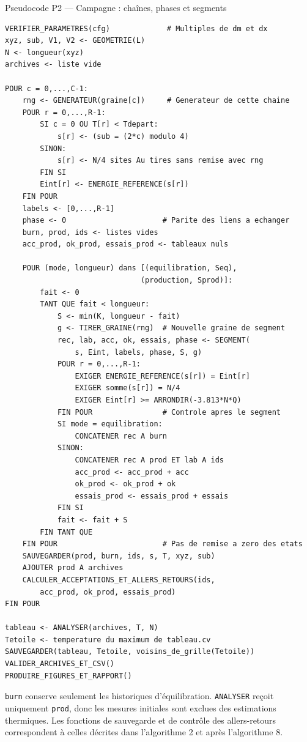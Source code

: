 \documentclass[10pt,a4paper]{article}
\begin{document}
\begin{algocode}{Pseudocode P2 --- Campagne : chaînes, phases et segments}
\small
\begin{verbatim}
VERIFIER_PARAMETRES(cfg)             # Multiples de dm et dx
xyz, sub, V1, V2 <- GEOMETRIE(L)
N <- longueur(xyz)
archives <- liste vide

POUR c = 0,...,C-1:
    rng <- GENERATEUR(graine[c])     # Generateur de cette chaine
    POUR r = 0,...,R-1:
        SI c = 0 OU T[r] < Tdepart:
            s[r] <- (sub = (2*c) modulo 4)
        SINON:
            s[r] <- N/4 sites Au tires sans remise avec rng
        FIN SI
        Eint[r] <- ENERGIE_REFERENCE(s[r])
    FIN POUR
    labels <- [0,...,R-1]
    phase <- 0                      # Parite des liens a echanger
    burn, prod, ids <- listes vides
    acc_prod, ok_prod, essais_prod <- tableaux nuls

    POUR (mode, longueur) dans [(equilibration, Seq),
                               (production, Sprod)]:
        fait <- 0
        TANT QUE fait < longueur:
            S <- min(K, longueur - fait)
            g <- TIRER_GRAINE(rng)  # Nouvelle graine de segment
            rec, lab, acc, ok, essais, phase <- SEGMENT(
                s, Eint, labels, phase, S, g)
            POUR r = 0,...,R-1:
                EXIGER ENERGIE_REFERENCE(s[r]) = Eint[r]
                EXIGER somme(s[r]) = N/4
                EXIGER Eint[r] >= ARRONDIR(-3.813*N*Q)
            FIN POUR                # Controle apres le segment
            SI mode = equilibration:
                CONCATENER rec A burn
            SINON:
                CONCATENER rec A prod ET lab A ids
                acc_prod <- acc_prod + acc
                ok_prod <- ok_prod + ok
                essais_prod <- essais_prod + essais
            FIN SI
            fait <- fait + S
        FIN TANT QUE
    FIN POUR                        # Pas de remise a zero des etats
    SAUVEGARDER(prod, burn, ids, s, T, xyz, sub)
    AJOUTER prod A archives
    CALCULER_ACCEPTATIONS_ET_ALLERS_RETOURS(ids,
        acc_prod, ok_prod, essais_prod)
FIN POUR

tableau <- ANALYSER(archives, T, N)
Tetoile <- temperature du maximum de tableau.cv
SAUVEGARDER(tableau, Tetoile, voisins_de_grille(Tetoile))
VALIDER_ARCHIVES_ET_CSV()
PRODUIRE_FIGURES_ET_RAPPORT()
\end{verbatim}
\end{algocode}

\texttt{burn} conserve seulement les historiques d'équilibration.
\texttt{ANALYSER} reçoit uniquement \texttt{prod}, donc les mesures
initiales sont exclues des estimations thermiques. Les fonctions de
sauvegarde et de contrôle des allers-retours correspondent à celles
décrites dans l'algorithme 2 et après l'algorithme 8.
\end{document}
